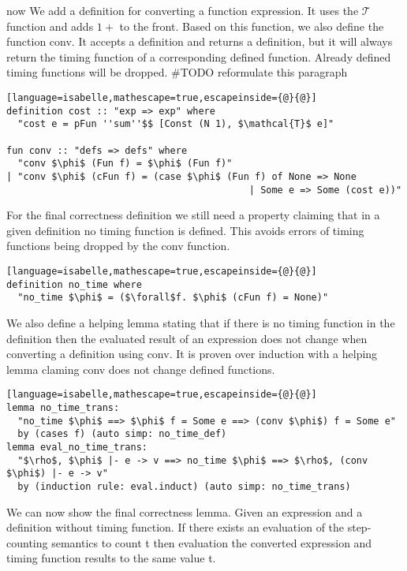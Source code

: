 now We add a definition for converting a function expression. It uses the $\mathcal{T}$ function and adds $1+$ to the front.
Based on this function, we also define the function conv. It accepts a definition and returns a definition, but it will always return the timing function of a corresponding defined function. Already defined timing functions will be dropped. \#TODO reformulate this paragraph

\begin{lstlisting}[language=isabelle,mathescape=true,escapeinside={@}{@}]
definition cost :: "exp => exp" where
  "cost e = pFun ''sum''$$ [Const (N 1), $\mathcal{T}$ e]"

fun conv :: "defs => defs" where
  "conv $\phi$ (Fun f) = $\phi$ (Fun f)"
| "conv $\phi$ (cFun f) = (case $\phi$ (Fun f) of None => None
                                           | Some e => Some (cost e))"
\end{lstlisting}

For the final correctness definition we still need a property claiming that in a given definition no timing function is defined.
This avoids errors of timing functions being dropped by the conv function.
\begin{lstlisting}[language=isabelle,mathescape=true,escapeinside={@}{@}]
definition no_time where
  "no_time $\phi$ = ($\forall$f. $\phi$ (cFun f) = None)"
\end{lstlisting}

We also define a helping lemma stating that if there is no timing function in the definition then the evaluated result of an expression does not change when converting a definition using conv.
It is proven over induction with a helping lemma claming conv does not change defined functions.

\begin{lstlisting}[language=isabelle,mathescape=true,escapeinside={@}{@}]
lemma no_time_trans:
  "no_time $\phi$ ==> $\phi$ f = Some e ==> (conv $\phi$) f = Some e"
  by (cases f) (auto simp: no_time_def)
lemma eval_no_time_trans:
  "$\rho$, $\phi$ |- e -> v ==> no_time $\phi$ ==> $\rho$, (conv $\phi$) |- e -> v"
  by (induction rule: eval.induct) (auto simp: no_time_trans)
\end{lstlisting}

We can now show the final correctness lemma.
Given an expression and a definition without timing function.
If there exists an evaluation of the step-counting semantics to count t then evaluation the converted expression and timing function results to the same value t.

